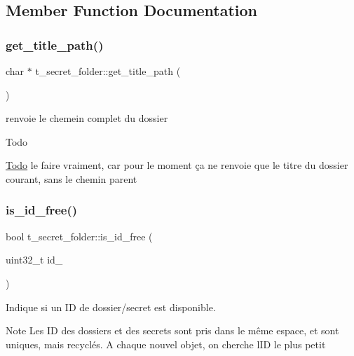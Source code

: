 \subsection{Member Function Documentation}
\mbox{\label{classt__secret__folder_a6e853312c39540414f50ba796f9961da}} 
\subsubsection{\texorpdfstring{get\+\_\+title\+\_\+path()}{get\_title\_path()}}
{\footnotesize\ttfamily char $\ast$ t\+\_\+secret\+\_\+folder\+::get\+\_\+title\+\_\+path (\begin{DoxyParamCaption}{ }\end{DoxyParamCaption})}



renvoie le chemein complet du dossier 

\begin{DoxyRefDesc}{Todo}
\item[\hyperlink{todo__todo000012}{Todo}]le faire vraiment, car pour le moment ça ne renvoie que le titre du dossier courant, sans le chemin parent \end{DoxyRefDesc}
\mbox{\label{classt__secret__folder_a8bc4123040163d7d226025d85c46116b}} 
\subsubsection{\texorpdfstring{is\+\_\+id\+\_\+free()}{is\_id\_free()}}
{\footnotesize\ttfamily bool t\+\_\+secret\+\_\+folder\+::is\+\_\+id\+\_\+free (\begin{DoxyParamCaption}\item[{uint32\+\_\+t}]{id\+\_\+ }\end{DoxyParamCaption})}



Indique si un ID de dossier/secret est disponible. 

\begin{DoxyNote}{Note}
Les ID des dossiers et des secrets sont pris dans le même espace, et sont uniques, mais recyclés. A chaque nouvel objet, on cherche l\textquotesingle{}ID le plus petit 
\end{DoxyNote}
\mbox{\label{classt__secret__folder_a8bc7cf9c9c5abc10bded9c3d4c54da26}} 
